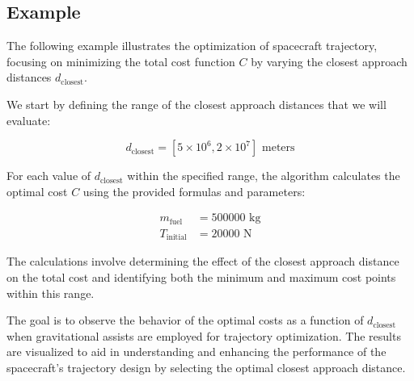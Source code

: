 \subsection{Example}

The following example illustrates the optimization of spacecraft trajectory, focusing on minimizing the total cost function \( C \) by varying the closest approach distances \( d_{\text{closest}} \).

We start by defining the range of the closest approach distances that we will evaluate:

\[
d_{\text{closest}} = [5 \times 10^6, 2 \times 10^7] \text{ meters}
\]

For each value of \( d_{\text{closest}} \) within the specified range, the algorithm calculates the optimal cost \( C \) using the provided formulas and parameters:

\begin{align*}
    m_{\text{fuel}} &= 500000 \text{ kg} \\
    T_{\text{initial}} &= 20000 \text{ N} 
\end{align*}

The calculations involve determining the effect of the closest approach distance on the total cost and identifying both the minimum and maximum cost points within this range.

The goal is to observe the behavior of the optimal costs as a function of \( d_{\text{closest}} \) when gravitational assists are employed for trajectory optimization. The results are visualized to aid in understanding and enhancing the performance of the spacecraft's trajectory design by selecting the optimal closest approach distance.